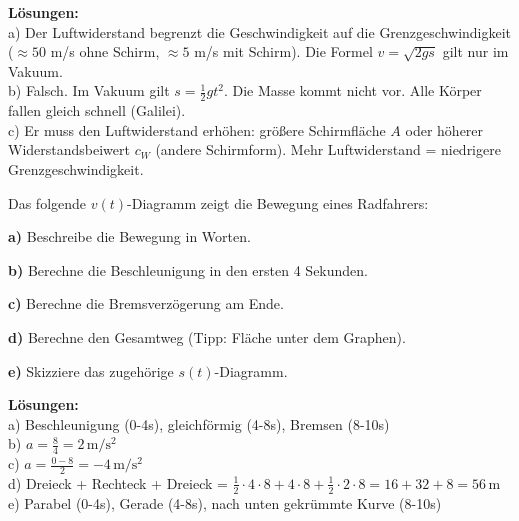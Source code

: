 \documentclass[11pt,a4paper]{article}
\begin{document}
\textbf{Lösungen:}\\
a) Der Luftwiderstand begrenzt die Geschwindigkeit auf die Grenzgeschwindigkeit ($\approx 50$ m/s ohne Schirm, $\approx 5$ m/s mit Schirm). Die Formel $v = \sqrt{2gs}$ gilt nur im Vakuum.\\
b) Falsch. Im Vakuum gilt $s = \frac{1}{2}gt^2$. Die Masse kommt nicht vor. Alle Körper fallen gleich schnell (Galilei).\\
c) Er muss den Luftwiderstand erhöhen: größere Schirmfläche $A$ oder höherer Widerstandsbeiwert $c_W$ (andere Schirmform). Mehr Luftwiderstand = niedrigere Grenzgeschwindigkeit.

\vspace{0.5cm}

\begin{aufgabe}
Das folgende $v(t)$-Diagramm zeigt die Bewegung eines Radfahrers:

\begin{center}
\end{center}

\textbf{a)} Beschreibe die Bewegung in Worten.

\textbf{b)} Berechne die Beschleunigung in den ersten 4 Sekunden.

\textbf{c)} Berechne die Bremsverzögerung am Ende.

\textbf{d)} Berechne den Gesamtweg (Tipp: Fläche unter dem Graphen).

\textbf{e)} Skizziere das zugehörige $s(t)$-Diagramm.
\end{aufgabe}

\textbf{Lösungen:}\\
a) Beschleunigung (0-4s), gleichförmig (4-8s), Bremsen (8-10s)\\
b) $a = \frac{8}{4} = 2\,\mathrm{m/s^2}$\\
c) $a = \frac{0-8}{2} = -4\,\mathrm{m/s^2}$\\
d) Dreieck + Rechteck + Dreieck = $\frac{1}{2} \cdot 4 \cdot 8 + 4 \cdot 8 + \frac{1}{2} \cdot 2 \cdot 8 = 16 + 32 + 8 = 56\,\mathrm{m}$\\
e) Parabel (0-4s), Gerade (4-8s), nach unten gekrümmte Kurve (8-10s)
\end{document}
